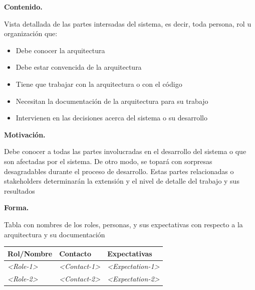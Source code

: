\documentclass[]{article}
\begin{document}
\textbf{Contenido.}

Vista detallada de las partes intersadas del sistema, es decir, toda
persona, rol u organización que:

\begin{itemize}
\item
  Debe conocer la arquitectura
\item
  Debe estar convencida de la arquitectura
\item
  Tiene que trabajar con la arquitectura o con el código
\item
  Necesitan la documentación de la arquitectura para su trabajo
\item
  Intervienen en las decisiones acerca del sistema o su desarrollo
\end{itemize}

\textbf{Motivación.}

Debe conocer a todas las partes involucradas en el desarrollo del
sistema o que son afectadas por el sistema. De otro modo, se topará con
sorpresas desagradables durante el proceso de desarrollo. Estas partes
relacionadas o stakeholders determinarán la extensión y el nivel de
detalle del trabajo y sus resultados

\textbf{Forma.}

Tabla con nombres de los roles, personas, y sus expectativas con
respecto a la arquitectura y su documentación

\begin{longtable}[]{@{}lll@{}}
\toprule
\begin{minipage}[b]{0.18\columnwidth}\raggedright
Rol/Nombre\strut
\end{minipage} & \begin{minipage}[b]{0.37\columnwidth}\raggedright
Contacto\strut
\end{minipage} & \begin{minipage}[b]{0.37\columnwidth}\raggedright
Expectativas\strut
\end{minipage}\tabularnewline
\midrule
\endhead
\begin{minipage}[t]{0.18\columnwidth}\raggedright
\emph{\textless{}Role-1\textgreater{}}\strut
\end{minipage} & \begin{minipage}[t]{0.37\columnwidth}\raggedright
\emph{\textless{}Contact-1\textgreater{}}\strut
\end{minipage} & \begin{minipage}[t]{0.37\columnwidth}\raggedright
\emph{\textless{}Expectation-1\textgreater{}}\strut
\end{minipage}\tabularnewline
\begin{minipage}[t]{0.18\columnwidth}\raggedright
\emph{\textless{}Role-2\textgreater{}}\strut
\end{minipage} & \begin{minipage}[t]{0.37\columnwidth}\raggedright
\emph{\textless{}Contact-2\textgreater{}}\strut
\end{minipage} & \begin{minipage}[t]{0.37\columnwidth}\raggedright
\emph{\textless{}Expectation-2\textgreater{}}\strut
\end{minipage}\tabularnewline
\bottomrule
\end{longtable}
\end{document}
